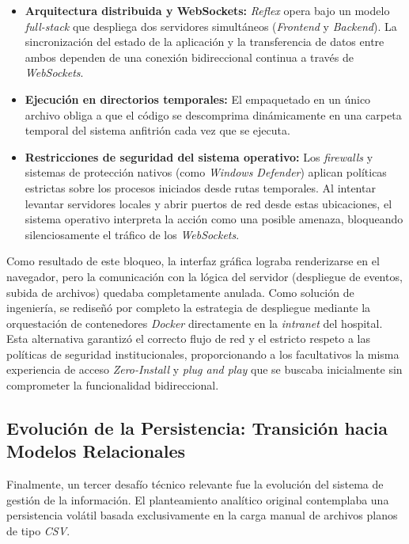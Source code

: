 \begin{itemize}
    \item \textbf{Arquitectura distribuida y WebSockets:} \textit{Reflex} opera bajo un modelo \textit{full-stack} que despliega dos servidores simultáneos (\textit{Frontend} y \textit{Backend}). La sincronización del estado de la aplicación y la transferencia de datos entre ambos dependen de una conexión bidireccional continua a través de \textit{WebSockets}.
    
    \item \textbf{Ejecución en directorios temporales:} El empaquetado en un único archivo obliga a que el código se descomprima dinámicamente en una carpeta temporal del sistema anfitrión cada vez que se ejecuta.
    
    \item \textbf{Restricciones de seguridad del sistema operativo:} Los \textit{firewalls} y sistemas de protección nativos (como \textit{Windows Defender}) aplican políticas estrictas sobre los procesos iniciados desde rutas temporales. Al intentar levantar servidores locales y abrir puertos de red desde estas ubicaciones, el sistema operativo interpreta la acción como una posible amenaza, bloqueando silenciosamente el tráfico de los \textit{WebSockets}.
\end{itemize}

Como resultado de este bloqueo, la interfaz gráfica lograba renderizarse en el navegador, pero la comunicación con la lógica del servidor (despliegue de eventos, subida de archivos) quedaba completamente anulada. Como solución de ingeniería, se rediseñó por completo la estrategia de despliegue mediante la orquestación de contenedores \textit{Docker} directamente en la \textit{intranet} del hospital. Esta alternativa garantizó el correcto flujo de red y el estricto respeto a las políticas de seguridad institucionales, proporcionando a los facultativos la misma experiencia de acceso \textit{Zero-Install} y \textit{plug and play} que se buscaba inicialmente sin comprometer la funcionalidad bidireccional.

\subsection{Evolución de la Persistencia: Transición hacia Modelos Relacionales}
Finalmente, un tercer desafío técnico relevante fue la evolución del sistema de gestión de la información. El planteamiento analítico original contemplaba una persistencia volátil basada exclusivamente en la carga manual de archivos planos de tipo \textit{CSV}. 

